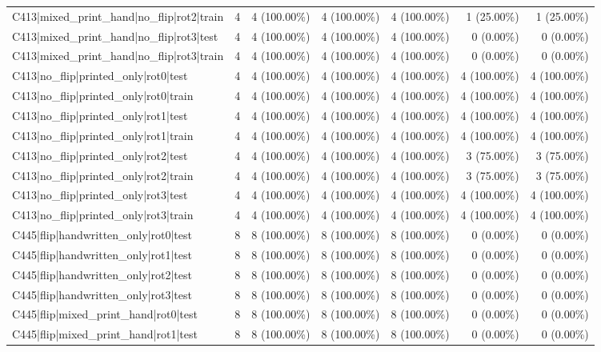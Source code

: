 \begin{longtable}{>{\raggedright\arraybackslash}p{5cm}rrrrrr}
C413|mixed\_print\_hand|no\_flip|rot2|train & 4 & 4 (100.00\%) & 4 (100.00\%) & 4 (100.00\%) & 1 (25.00\%) & 1 (25.00\%) \\
C413|mixed\_print\_hand|no\_flip|rot3|test & 4 & 4 (100.00\%) & 4 (100.00\%) & 4 (100.00\%) & 0 (0.00\%) & 0 (0.00\%) \\
C413|mixed\_print\_hand|no\_flip|rot3|train & 4 & 4 (100.00\%) & 4 (100.00\%) & 4 (100.00\%) & 0 (0.00\%) & 0 (0.00\%) \\
C413|no\_flip|printed\_only|rot0|test & 4 & 4 (100.00\%) & 4 (100.00\%) & 4 (100.00\%) & 4 (100.00\%) & 4 (100.00\%) \\
C413|no\_flip|printed\_only|rot0|train & 4 & 4 (100.00\%) & 4 (100.00\%) & 4 (100.00\%) & 4 (100.00\%) & 4 (100.00\%) \\
C413|no\_flip|printed\_only|rot1|test & 4 & 4 (100.00\%) & 4 (100.00\%) & 4 (100.00\%) & 4 (100.00\%) & 4 (100.00\%) \\
C413|no\_flip|printed\_only|rot1|train & 4 & 4 (100.00\%) & 4 (100.00\%) & 4 (100.00\%) & 4 (100.00\%) & 4 (100.00\%) \\
C413|no\_flip|printed\_only|rot2|test & 4 & 4 (100.00\%) & 4 (100.00\%) & 4 (100.00\%) & 3 (75.00\%) & 3 (75.00\%) \\
C413|no\_flip|printed\_only|rot2|train & 4 & 4 (100.00\%) & 4 (100.00\%) & 4 (100.00\%) & 3 (75.00\%) & 3 (75.00\%) \\
C413|no\_flip|printed\_only|rot3|test & 4 & 4 (100.00\%) & 4 (100.00\%) & 4 (100.00\%) & 4 (100.00\%) & 4 (100.00\%) \\
C413|no\_flip|printed\_only|rot3|train & 4 & 4 (100.00\%) & 4 (100.00\%) & 4 (100.00\%) & 4 (100.00\%) & 4 (100.00\%) \\
C445|flip|handwritten\_only|rot0|test & 8 & 8 (100.00\%) & 8 (100.00\%) & 8 (100.00\%) & 0 (0.00\%) & 0 (0.00\%) \\
C445|flip|handwritten\_only|rot1|test & 8 & 8 (100.00\%) & 8 (100.00\%) & 8 (100.00\%) & 0 (0.00\%) & 0 (0.00\%) \\
C445|flip|handwritten\_only|rot2|test & 8 & 8 (100.00\%) & 8 (100.00\%) & 8 (100.00\%) & 0 (0.00\%) & 0 (0.00\%) \\
C445|flip|handwritten\_only|rot3|test & 8 & 8 (100.00\%) & 8 (100.00\%) & 8 (100.00\%) & 0 (0.00\%) & 0 (0.00\%) \\
C445|flip|mixed\_print\_hand|rot0|test & 8 & 8 (100.00\%) & 8 (100.00\%) & 8 (100.00\%) & 0 (0.00\%) & 0 (0.00\%) \\
C445|flip|mixed\_print\_hand|rot1|test & 8 & 8 (100.00\%) & 8 (100.00\%) & 8 (100.00\%) & 0 (0.00\%) & 0 (0.00\%) \\

\end{longtable}
